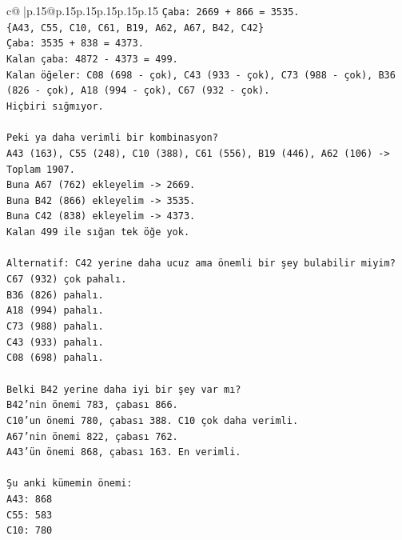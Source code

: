 \documentclass{article}
\begin{document}
{\begin{supertabular}{c@{$\;$}|p{.15\linewidth}@{}p{.15\linewidth}p{.15\linewidth}p{.15\linewidth}p{.15\linewidth}p{.15\linewidth}}
{{{\texttt{Çaba: 2669 + 866 = 3535.} \\
\texttt{\{A43, C55, C10, C61, B19, A62, A67, B42, C42\}} \\
\texttt{Çaba: 3535 + 838 = 4373.} \\
\texttt{Kalan çaba: 4872 {-} 4373 = 499.} \\
\texttt{Kalan öğeler: C08 (698 {-} çok), C43 (933 {-} çok), C73 (988 {-} çok), B36 (826 {-} çok), A18 (994 {-} çok), C67 (932 {-} çok).} \\
\texttt{Hiçbiri sığmıyor.} \\
\\ 
\texttt{Peki ya daha verimli bir kombinasyon?} \\
\texttt{A43 (163), C55 (248), C10 (388), C61 (556), B19 (446), A62 (106) {-}> Toplam 1907.} \\
\texttt{Buna A67 (762) ekleyelim {-}> 2669.} \\
\texttt{Buna B42 (866) ekleyelim {-}> 3535.} \\
\texttt{Buna C42 (838) ekleyelim {-}> 4373.} \\
\texttt{Kalan 499 ile sığan tek öğe yok.} \\
\\ 
\texttt{Alternatif: C42 yerine daha ucuz ama önemli bir şey bulabilir miyim?} \\
\texttt{C67 (932) çok pahalı.} \\
\texttt{B36 (826) pahalı.} \\
\texttt{A18 (994) pahalı.} \\
\texttt{C73 (988) pahalı.} \\
\texttt{C43 (933) pahalı.} \\
\texttt{C08 (698) pahalı.} \\
\\ 
\texttt{Belki B42 yerine daha iyi bir şey var mı?} \\
\texttt{B42'nin önemi 783, çabası 866.} \\
\texttt{C10'un önemi 780, çabası 388. C10 çok daha verimli.} \\
\texttt{A67'nin önemi 822, çabası 762.} \\
\texttt{A43'ün önemi 868, çabası 163. En verimli.} \\
\\ 
\texttt{Şu anki kümemin önemi:} \\
\texttt{A43: 868} \\
\texttt{C55: 583} \\
\texttt{C10: 780} \\
}}}
\end{supertabular}}
\end{document}
